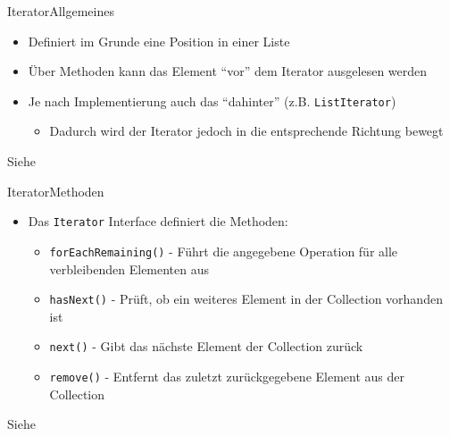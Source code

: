 \begin{frame}{Iterator}{Allgemeines}
    \begin{itemize}[<+->]
        \item Definiert im Grunde eine Position in einer Liste
        \item Über Methoden kann das Element "`vor"' dem Iterator ausgelesen werden
        \item Je nach Implementierung auch das "`dahinter"' (z.B. \texttt{ListIterator})
        \begin{itemize}
            \item Dadurch wird der Iterator jedoch in die entsprechende Richtung bewegt
        \end{itemize}
    \end{itemize}
    Siehe \cite{orac:iterators}
\end{frame}

\begin{frame}{Iterator}{Methoden}
    \begin{itemize}[<+->]
        \item Das \texttt{Iterator} Interface definiert die Methoden:
        \begin{itemize}
            \item \texttt{forEachRemaining()} - Führt die angegebene Operation für alle verbleibenden Elementen aus
            \item \texttt{hasNext()} - Prüft, ob ein weiteres Element in der Collection vorhanden ist
            \item \texttt{next()} - Gibt das nächste Element der Collection zurück
            \item \texttt{remove()} - Entfernt das zuletzt zurückgegebene Element aus der Collection
        \end{itemize}
    \end{itemize}
    Siehe \cite{orac:iterators}
\end{frame}

